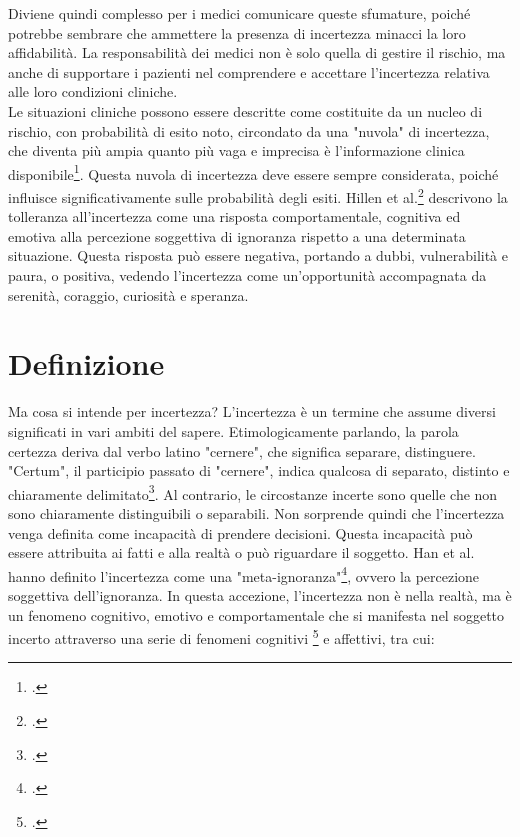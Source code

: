 Diviene quindi complesso per i medici comunicare queste sfumature, poiché potrebbe sembrare che ammettere la presenza di incertezza minacci la loro affidabilità. La responsabilità dei medici non è solo quella di gestire il rischio, ma anche di supportare i pazienti nel comprendere e accettare l'incertezza relativa alle loro condizioni cliniche. \\
Le situazioni cliniche possono essere descritte come costituite da un nucleo di rischio, con probabilità di esito noto, circondato da una "nuvola" di incertezza, che diventa più ampia quanto più vaga e imprecisa è l'informazione clinica disponibile\footcite{womak:clinica-relazione-decisione}. Questa nuvola di incertezza deve essere sempre considerata, poiché influisce significativamente sulle probabilità degli esiti.
Hillen et al.\footcite{womak:tolleranza-incertezza} descrivono la tolleranza all'incertezza come una risposta comportamentale, cognitiva ed emotiva alla percezione soggettiva di ignoranza rispetto a una determinata situazione. Questa risposta può essere negativa, portando a dubbi, vulnerabilità e paura, o positiva, vedendo l'incertezza come un'opportunità accompagnata da serenità, coraggio, curiosità e speranza.


\section{Definizione}

Ma cosa si intende per incertezza? L'incertezza è un termine che assume diversi significati in vari ambiti del sapere. Etimologicamente parlando, la parola certezza deriva dal verbo latino "cernere", che significa separare, distinguere. "Certum", il participio passato di "cernere", indica qualcosa di separato, distinto e chiaramente delimitato\footcite{womak:recenti-progressi-medicina}. Al contrario, le circostanze incerte sono quelle che non sono chiaramente distinguibili o separabili. Non sorprende quindi che l'incertezza venga definita come incapacità di prendere decisioni. Questa incapacità può essere attribuita ai fatti e alla realtà o può riguardare il soggetto. Han et al. hanno definito l'incertezza come una "meta-ignoranza"\footcite{womak:meta-ignoranza}, ovvero la percezione soggettiva dell'ignoranza. In questa accezione, l'incertezza non è nella realtà, ma è un fenomeno cognitivo, emotivo e comportamentale che si manifesta nel soggetto incerto attraverso una serie di fenomeni cognitivi \footcite{womak:recenti-progressi-medicina} e affettivi, tra cui:

